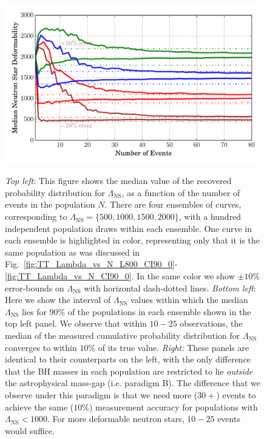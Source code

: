 \documentclass[aps,prd,amsmath,floats,floatfix, twocolumn,
superscriptaddress,nofootinbib,showpacs]{revtex4-1}
\newcommand{\lambdans}{\Lambda_\mathrm{NS}}
\begin{document}
\begin{figure}
\includegraphics[trim=0 0 1cm 0, width=1.025\columnwidth]{plots/LambdaMedian90pc_vs_N_AstroPopulation}\\
\caption{%
{\it Top left}: This figure shows the median value of the recovered
probability distribution for $\lambdans$, as a function of the number of events
in the population $N$. There are four ensembles of curves,
corresponding to $\lambdans=\{500,1000,1500,2000\}$, with a hundred
independent population draws within each ensemble. One curve in each ensemble
is highlighted in color, representing only that it is the same population as 
was discussed in
Fig.~\ref{fig:TT_Lambda_vs_N_L800_CI90_0}-\ref{fig:TT_Lambda_vs_N_CI90_0}.
In the same color we show $\pm 10\%$ error-bounds on $\lambdans$ with
horizontal dash-dotted lines.
{\it Bottom left}: Here we show the interval of $\lambdans$ values within
which the median $\lambdans$ lies for $90\%$ of the populations in
each ensemble shown in the top left panel.
% 
We observe that within $10-25$ observations, the median of the measured 
cumulative probability distribution for $\lambdans$ converges to within $10\%$
of its true value.
% 
{\it Right:} These panels are identical to their counterparts on the left,
with the only difference that the BH masses in each population are restricted
to lie {\it outside} the astrophysical mass-gap (i.e. paradigm B). The
difference that
we observe under this paradigm is that we need more ($30+$) events to achieve 
the same ($10\%$) measurement accuracy for populations with $\lambdans<1000$.
For more deformable neutron stars, $10-25$ events would suffice.
}
\label{fig:TT_LambdaMedian_vs_N_AllInOne}
\end{figure} 
% 
% 
\end{document}
